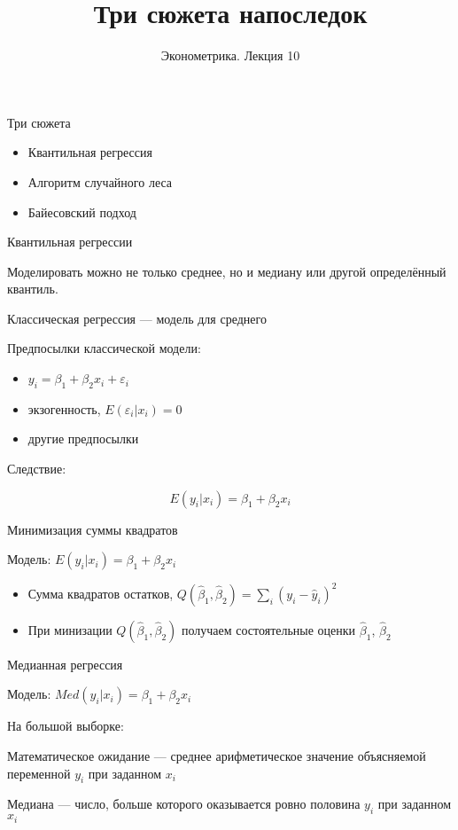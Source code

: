 \documentclass[ignorenonframetext,]{beamer}
\author[Эконометрика. Лекция 10]{Эконометрика. Лекция 10}
\title{Три сюжета напоследок}
\date{}
\newcommand{\e}{\varepsilon}
\newcommand{\hy}{\hat{y}}
\newcommand{\hb}{\hat{\beta}}
\begin{document}
\frame{\titlepage}

\begin{frame}{Три сюжета}

\begin{itemize}
\item
  Квантильная регрессия
\item
  Алгоритм случайного леса
\item
  Байесовский подход
\end{itemize}

\end{frame}

\begin{frame}{Квантильная регрессии}

Моделировать можно не только среднее, но и медиану или другой
определённый квантиль.

\end{frame}

\begin{frame}{Классическая регрессия --- модель для среднего}

Предпосылки классической модели:

\begin{itemize}
\item
  \(y_i=\beta_1 + \beta_2 x_i + \e_i\)
\item
  экзогенность, \(E(\e_i | x_i)=0\)
\item
  другие предпосылки
\end{itemize}

Следствие:

\[
E(y_i|x_i)=\beta_1 + \beta_2 x_i
\]

\end{frame}

\begin{frame}{Минимизация суммы квадратов}

Модель: \(E(y_i|x_i)=\beta_1 + \beta_2 x_i\)

\begin{itemize}
\item
  Сумма квадратов остатков, \(Q(\hb_1,\hb_2)=\sum_i (y_i - \hy_i)^2\)
\item
  При минизации \(Q(\hb_1,\hb_2)\) получаем состоятельные оценки
  \(\hb_1\), \(\hb_2\)
\end{itemize}

\end{frame}

\begin{frame}{Медианная регрессия}

Модель: \(Med(y_i|x_i)=\beta_1 + \beta_2 x_i\)

На большой выборке:

Математическое ожидание --- среднее арифметическое значение объясняемой
переменной \(y_i\) при заданном \(x_i\)

Медиана --- число, больше которого оказывается ровно половина \(y_i\)
при заданном \(x_i\)

\end{frame}
\end{document}
